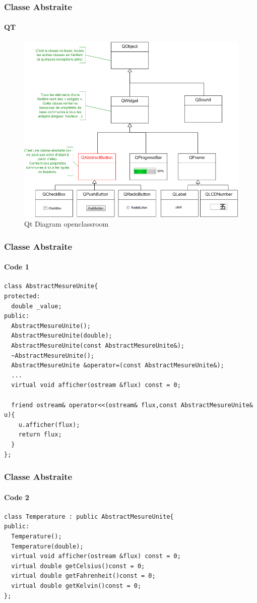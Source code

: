 \documentclass[10pt]{beamer}
\begin{document}
\begin{frame}
  \frametitle{Classe Abstraite}
  \framesubtitle{QT}
  \begin{center}
    \begin{figure}
      \includegraphics[scale=0.3]{img/qtUml.png}
      \caption{Qt Diagram openclassroom}
    \end{figure}
  \end{center}
\end{frame}

\begin{frame}[fragile]
  \frametitle{Classe Abstraite}
  \framesubtitle{Code 1}
  \begin{verbatim}
class AbstractMesureUnite{
protected:
  double _value;
public:
  AbstractMesureUnite();
  AbstractMesureUnite(double);
  AbstractMesureUnite(const AbstractMesureUnite&);
  ~AbstractMesureUnite();
  AbstractMesureUnite &operator=(const AbstractMesureUnite&);
  ...
  virtual void afficher(ostream &flux) const = 0;

  friend ostream& operator<<(ostream& flux,const AbstractMesureUnite& u){
    u.afficher(flux);
    return flux;
  }
};
  \end{verbatim}
\end{frame}
\begin{frame}[fragile]
  \frametitle{Classe Abstraite}
  \framesubtitle{Code 2}
  \begin{verbatim}
class Temperature : public AbstractMesureUnite{
public:
  Temperature();
  Temperature(double);
  virtual void afficher(ostream &flux) const = 0;
  virtual double getCelsius()const = 0;
  virtual double getFahrenheit()const = 0;
  virtual double getKelvin()const = 0;
};
  \end{verbatim}
\end{frame}
\end{document}
